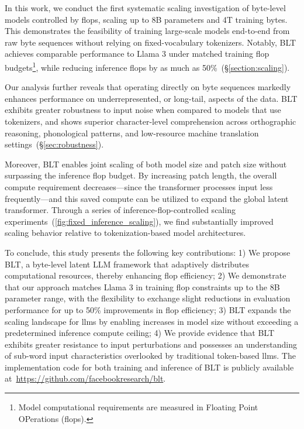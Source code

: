 In this work, we conduct the first systematic scaling investigation of byte-level models controlled by flops, scaling up to 8B parameters and 4T training bytes. This demonstrates the feasibility of training large-scale models end-to-end from raw byte sequences without relying on fixed-vocabulary tokenizers. Notably, {\textsc BLT} achieves comparable performance to Llama 3 under matched training flop budgets\footnote{Model computational requirements are measured in Floating Point OPerations (flops).}, while reducing inference flops by as much as 50\%~(\S\ref{section:scaling}). 

Our analysis further reveals that operating directly on byte sequences markedly enhances performance on underrepresented, or long-tail, aspects of the data. {\textsc BLT} exhibits greater robustness to input noise when compared to models that use tokenizers, and shows superior character-level comprehension across orthographic reasoning, phonological patterns, and low-resource machine translation settings~(\S\ref{sec:robustness}).

Moreover, {\textsc BLT} enables joint scaling of both model size and patch size without surpassing the inference flop budget. By increasing patch length, the overall compute requirement decreases—since the transformer processes input less frequently—and this saved compute can be utilized to expand the global latent transformer. Through a series of inference-flop-controlled scaling experiments~(\autoref{fig:fixed_inference_scaling}), we find substantially improved scaling behavior relative to tokenization-based model architectures.

To conclude, this study presents the following key contributions: 1) We propose {\textsc BLT}, a byte-level latent LLM framework that adaptively distributes computational resources, thereby enhancing flop efficiency; 2) We demonstrate that our approach matches Llama 3 in training flop constraints up to the 8B parameter range, with the flexibility to exchange slight reductions in evaluation performance for up to 50\% improvements in flop efficiency; 3) {\textsc BLT} expands the scaling landscape for llms by enabling increases in model size without exceeding a predetermined inference compute ceiling; 4) We provide evidence that {\textsc BLT} exhibits greater resistance to input perturbations and possesses an understanding of sub-word input characteristics overlooked by traditional token-based llms. The implementation code for both training and inference of {\textsc BLT} is publicly available at~\url{https://github.com/facebookresearch/blt}.

